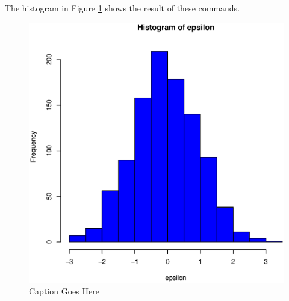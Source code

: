 \documentclass[11pt]{article}
\begin{document}
The histogram in Figure \ref{fig:example} shows the result of these commands.

\begin{figure}[h]
\centering
\includegraphics[width=\textwidth]{Figures/name_of_figure.eps}
\caption{Caption Goes Here}
\label{fig:example}
\end{figure}
\end{document}
